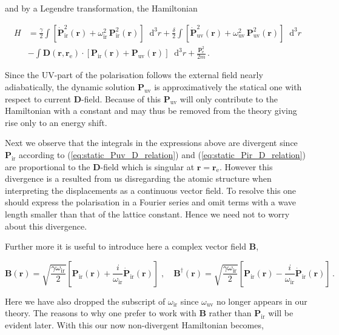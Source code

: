 \documentclass[12pt]{report}
\renewcommand{\vec}[1]{\boldsymbol{\mathbf{#1}}}                        %
\newcommand*\diff{\mathop{}\!\mathrm{d}}
\begin{document}
and by a Legendre transformation, the Hamiltonian

\begin{equation}
	\label{eq:Hamiltonian_raw}
	\begin{split}
		H &= \frac{\gamma}{2} \int \left[ \dot{\vec P}_\text{ir}^2 (\vec r) + \omega_\text{ir}^2 \, \vec P_\text{ir}^2 (\vec r) \right] \diff^3 r
		+ \frac{\delta}{2} \int \left[ \dot{\vec P}_\text{uv}^2 (\vec r) + \omega_\text{uv}^2 \, \vec P_\text{uv}^2 (\vec r) \right] \diff^3 r \\
		&- \int \vec D(\vec r, \vec r_\text{e}) \cdot \left[ \vec P_\text{ir}(\vec r) +  \vec P_\text{uv}(\vec r) \right] \diff^3 r
		+ \frac{\vec p_\text{e}^2}{2m}	\,.
	\end{split}
\end{equation}

Since the UV-part of the polarisation follows the external field nearly adiabatically, the dynamic solution $ \vec P_\text{uv} $ is approximatively the statical one with respect to current $ \vec D $-field. Because of this $ \vec P_\text{uv} $ will only contribute to the Hamiltonian with a constant and may thus be removed from the theory giving rise only to an energy shift.

Next we observe that the integrals in the expressions above are divergent since $ \vec P_\text{ir} $ according to (\ref{eq:static_Puv_D_relation}) and (\ref{eq:static_Pir_D_relation}) are proportional to the $ \vec D $-field which is singular at $ \vec r = \vec r_\text{e} $. However this divergence is a resulted from us disregarding the atomic structure when interpreting the displacements as a continuous vector field. To resolve this one should express the polarisation in a Fourier series and omit terms with a wave length smaller than that of the lattice constant. Hence we need not to worry about this divergence.

Further more it is useful to introduce here a complex vector field $ \vec B $,

\begin{equation}
	\label{eq:B_field_def}
	\vec B(\vec r) = \sqrt{\frac{\gamma \omega_\text{ir}}{2}} \left[ \vec P_\text{ir}(\vec r) + \frac{i}{\omega_\text{ir}} \dot{\vec P}_\text{ir}(\vec r) \right]
	\; , \quad
	\vec B^\dagger(\vec r) = \sqrt{\frac{\gamma \omega_\text{ir}}{2}} \left[ \vec P_\text{ir}(\vec r) - \frac{i}{\omega_\text{ir}} \dot{\vec P}_\text{ir}(\vec r) \right] \,.
\end{equation}

Here we have also dropped the subscript of $ \omega_\text{ir} $ since $ \omega_\text{uv} $ no longer appears in our theory. The reasons to why one prefer to work with $ \vec B $ rather than $ \vec P_\text{ir} $ will be evident later. With this our now non-divergent Hamiltonian becomes,
\end{document}
